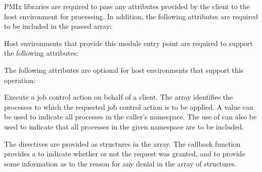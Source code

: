 \reqattrstart
\ac{PMIx} libraries are required to pass any attributes provided by the client to the host environment for processing. In addition, the following attributes are required to be included in the passed  array:


\divider

Host environments that provide this module entry point are required to support the following attributes:


\reqattrend

\optattrstart
The following attributes are optional for host environments that support this operation:


\optattrend

\descr

Execute a job control action on behalf of a client. The  array identifies the processes to which the requested job control action is to be applied.
A  value can be used to indicate all processes in the caller's namespace.
The use of  can also be used to indicate that all processes in the given namespace are to be included.

The directives are provided as  structures in the  array.
The callback function provides a  to indicate whether or not the request was granted, and to provide some information as to the reason for any denial in the  array of  structures.


\subsection{}

